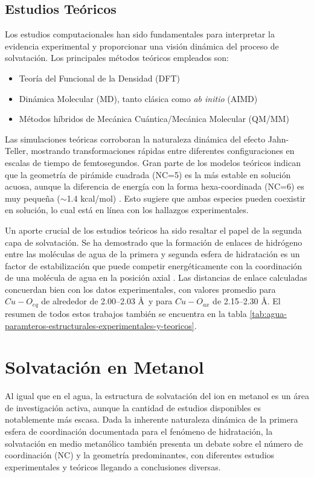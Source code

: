     \subsection*{Estudios Teóricos}

    Los estudios computacionales han sido fundamentales para interpretar la evidencia experimental y proporcionar una visión dinámica del proceso de solvatación. Los principales métodos teóricos empleados son:
    \begin{itemize}
        \item Teoría del Funcional de la Densidad (DFT)
        \item Dinámica Molecular (MD), tanto clásica como \textit{ab initio} (AIMD)
        \item Métodos híbridos de Mecánica Cuántica/Mecánica Molecular (QM/MM)
    \end{itemize}

    Las simulaciones teóricas corroboran la naturaleza dinámica del efecto Jahn-Teller, mostrando transformaciones rápidas entre diferentes configuraciones en escalas de tiempo de femtosegundos. Gran parte de los modelos teóricos indican que la geometría de pirámide cuadrada (NC=5) es la más estable en solución acuosa, aunque la diferencia de energía con la forma hexa-coordinada (NC=6) es muy pequeña ($\sim$1.4 kcal/mol) \cite{Wa-2008-01, Wa-2009-02}. Esto sugiere que ambas especies pueden coexistir en solución, lo cual está en línea con los hallazgos experimentales.

    Un aporte crucial de los estudios teóricos ha sido resaltar el papel de la segunda capa de solvatación. Se ha demostrado que la formación de enlaces de hidrógeno entre las moléculas de agua de la primera y segunda esfera de hidratación es un factor de estabilización que puede competir energéticamente con la coordinación de una molécula de agua en la posición axial \cite{Wa-2007-03, Wa-2008-01,Wa-2024-01}. Las distancias de enlace calculadas concuerdan bien con los datos experimentales, con valores promedio para $Cu-O_{eq}$ de alrededor de 2.00--2.03 \AA \ y para $Cu-O_{ax}$ de 2.15--2.30 \AA. El resumen de todos estos trabajos también se encuentra en la tabla \ref{tab:agua-paramteros-estructurales-experimentales-y-teoricos}.

\section{Solvatación  en Metanol}

Al igual que en el agua, la estructura de solvatación del ion  en metanol es un área de investigación activa, aunque la cantidad de estudios disponibles es notablemente más escasa. Dada la inherente naturaleza dinámica de la primera esfera de coordinación documentada para el fenómeno de hidratación, la solvatación en medio metanólico también presenta un debate sobre el número de coordinación (NC) y la geometría predominantes, con diferentes estudios experimentales y teóricos llegando a conclusiones diversas.


